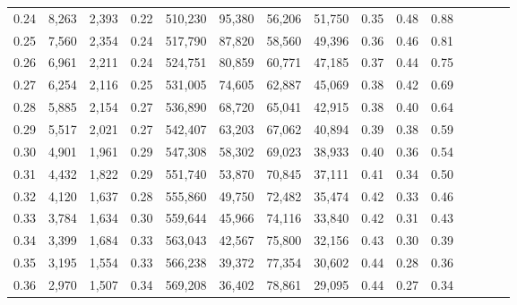 \begin{tabular}{rrrcrrrrrrrrrrr}
0.24 &   8,263 &  2,393 &                                       0.22 &  510,230 &   95,380 &   56,206 &   51,750 &  0.35 &  0.48 &                         0.88 \\
0.25 &   7,560 &  2,354 &                                       0.24 &  517,790 &   87,820 &   58,560 &   49,396 &  0.36 &  0.46 &                         0.81 \\
0.26 &   6,961 &  2,211 &                                       0.24 &  524,751 &   80,859 &   60,771 &   47,185 &  0.37 &  0.44 &                         0.75 \\
0.27 &   6,254 &  2,116 &                                       0.25 &  531,005 &   74,605 &   62,887 &   45,069 &  0.38 &  0.42 &                         0.69 \\
0.28 &   5,885 &  2,154 &                                       0.27 &  536,890 &   68,720 &   65,041 &   42,915 &  0.38 &  0.40 &                         0.64 \\
0.29 &   5,517 &  2,021 &                                       0.27 &  542,407 &   63,203 &   67,062 &   40,894 &  0.39 &  0.38 &                         0.59 \\
0.30 &   4,901 &  1,961 &                                       0.29 &  547,308 &   58,302 &   69,023 &   38,933 &  0.40 &  0.36 &                         0.54 \\
0.31 &   4,432 &  1,822 &                                       0.29 &  551,740 &   53,870 &   70,845 &   37,111 &  0.41 &  0.34 &                         0.50 \\
0.32 &   4,120 &  1,637 &                                       0.28 &  555,860 &   49,750 &   72,482 &   35,474 &  0.42 &  0.33 &                         0.46 \\
0.33 &   3,784 &  1,634 &                                       0.30 &  559,644 &   45,966 &   74,116 &   33,840 &  0.42 &  0.31 &                         0.43 \\
0.34 &   3,399 &  1,684 &                                       0.33 &  563,043 &   42,567 &   75,800 &   32,156 &  0.43 &  0.30 &                         0.39 \\
0.35 &   3,195 &  1,554 &                                       0.33 &  566,238 &   39,372 &   77,354 &   30,602 &  0.44 &  0.28 &                         0.36 \\
0.36 &   2,970 &  1,507 &                                       0.34 &  569,208 &   36,402 &   78,861 &   29,095 &  0.44 &  0.27 &                         0.34 \\

\end{tabular}
